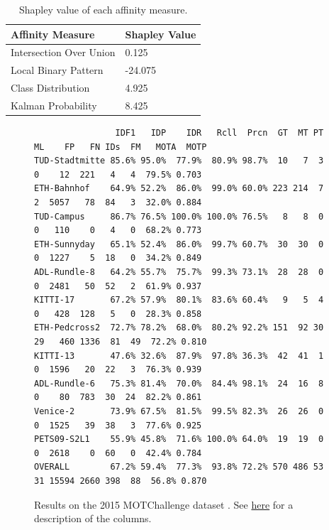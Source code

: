 \documentclass[10pt,twocolumn,letterpaper]{article}
\begin{document}
\begin{table}[h]
\begin {center}
\begin{tabular}{|l|l|}
\hline
\textbf{Affinity Measure} & \textbf{Shapley Value} \\ \hline
Intersection Over Union   & 0.125                  \\ \hline
Local Binary Pattern      & -24.075                \\ \hline
Class Distribution        & 4.925                  \\ \hline
Kalman Probability        & 8.425                  \\ \hline
\end{tabular}
\caption{Shapley value of each affinity measure.}
\label{tab:shapley_val_table}
\end{center}
\end{table}


\begin{figure}[h]
\begin{verbatim}
                IDF1   IDP    IDR   Rcll  Prcn  GT  MT PT ML    FP   FN IDs  FM   MOTA  MOTP
TUD-Stadtmitte 85.6% 95.0%  77.9%  80.9% 98.7%  10   7  3  0    12  221   4   4  79.5% 0.703
ETH-Bahnhof    64.9% 52.2%  86.0%  99.0% 60.0% 223 214  7  2  5057   78  84   3  32.0% 0.884
TUD-Campus     86.7% 76.5% 100.0% 100.0% 76.5%   8   8  0  0   110    0   4   0  68.2% 0.773
ETH-Sunnyday   65.1% 52.4%  86.0%  99.7% 60.7%  30  30  0  0  1227    5  18   0  34.2% 0.849
ADL-Rundle-8   64.2% 55.7%  75.7%  99.3% 73.1%  28  28  0  0  2481   50  52   2  61.9% 0.937
KITTI-17       67.2% 57.9%  80.1%  83.6% 60.4%   9   5  4  0   428  128   5   0  28.3% 0.858
ETH-Pedcross2  72.7% 78.2%  68.0%  80.2% 92.2% 151  92 30 29   460 1336  81  49  72.2% 0.810
KITTI-13       47.6% 32.6%  87.9%  97.8% 36.3%  42  41  1  0  1596   20  22   3  76.3% 0.939
ADL-Rundle-6   75.3% 81.4%  70.0%  84.4% 98.1%  24  16  8  0    80  783  30  24  82.2% 0.861
Venice-2       73.9% 67.5%  81.5%  99.5% 82.3%  26  26  0  0  1525   39  38   3  77.6% 0.925
PETS09-S2L1    55.9% 45.8%  71.6% 100.0% 64.0%  19  19  0  0  2618    0  60   0  42.4% 0.784
OVERALL        67.2% 59.4%  77.3%  93.8% 72.2% 570 486 53 31 15594 2660 398  88  56.8% 0.870
\end{verbatim}
\caption{Results on the 2015 MOTChallenge dataset \cite{motchallenge2015}. See \href{https://github.com/cheind/py-motmetrics/blob/master/Readme.md\#metrics}{here} for a description of the columns.}
\label{tab:MOT_results}
\end{figure}
\end{document}
